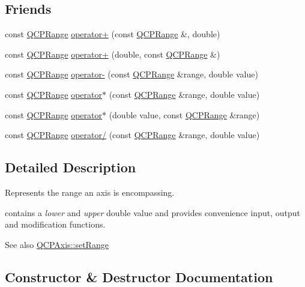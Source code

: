\subsection*{Friends}
\begin{DoxyCompactItemize}
\item 
const \hyperlink{classQCPRange}{Q\+C\+P\+Range} \hyperlink{classQCPRange_af53ea6fb823a4a5897162b865841de04}{operator+} (const \hyperlink{classQCPRange}{Q\+C\+P\+Range} \&, double)
\item 
const \hyperlink{classQCPRange}{Q\+C\+P\+Range} \hyperlink{classQCPRange_a9fb2e9941d32001482df670c0d704977}{operator+} (double, const \hyperlink{classQCPRange}{Q\+C\+P\+Range} \&)
\item 
const \hyperlink{classQCPRange}{Q\+C\+P\+Range} \hyperlink{classQCPRange_a797f82830b516646da8873f82e39e356}{operator-\/} (const \hyperlink{classQCPRange}{Q\+C\+P\+Range} \&range, double value)
\item 
const \hyperlink{classQCPRange}{Q\+C\+P\+Range} \hyperlink{classQCPRange_a558b1248ff6a9e41fd5b2630555a8acc}{operator$\ast$} (const \hyperlink{classQCPRange}{Q\+C\+P\+Range} \&range, double value)
\item 
const \hyperlink{classQCPRange}{Q\+C\+P\+Range} \hyperlink{classQCPRange_a5cb2332f6957021f47cc768089f4f090}{operator$\ast$} (double value, const \hyperlink{classQCPRange}{Q\+C\+P\+Range} \&range)
\item 
const \hyperlink{classQCPRange}{Q\+C\+P\+Range} \hyperlink{classQCPRange_a4b366a3a21974c88e09b0d39d4a24a4b}{operator/} (const \hyperlink{classQCPRange}{Q\+C\+P\+Range} \&range, double value)
\end{DoxyCompactItemize}


\subsection{Detailed Description}
Represents the range an axis is encompassing. 

contains a {\itshape lower} and {\itshape upper} double value and provides convenience input, output and modification functions.

\begin{DoxySeeAlso}{See also}
\hyperlink{classQCPAxis_aebdfea5d44c3a0ad2b4700cd4d25b641}{Q\+C\+P\+Axis\+::set\+Range} 
\end{DoxySeeAlso}


\subsection{Constructor \& Destructor Documentation}

